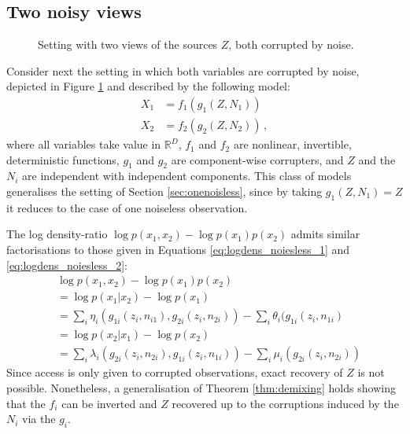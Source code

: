 \subsection{Two noisy views}
\label{sec:constrained}

\begin{figure}[t!]
	\centering
	\caption{Setting with two views of the sources $Z$, both corrupted by noise.}
	\label{fig:classic_hsr}
\end{figure}

Consider next the setting in which both variables are corrupted by noise, depicted in Figure \ref{fig:classic_hsr} and described by the following model:
\begin{align*}
X_{1}&={f}_{1}({g}_{1}({Z},N_{1}))  \\
X_{2}&={f}_{2}({g}_{2}({Z},N_{2}))  \,,
\end{align*}
where all variables take value in $\mathbb{R}^D$, ${f}_{1}$ and ${f}_{2}$ are nonlinear, invertible, deterministic functions,
${g}_{1}$ and ${g}_{2}$ are component-wise corrupters, and $Z$ and the $N_i$ are independent with independent components.
This class of models generalises the setting of Section \ref{sec:onenoisless}, since by taking ${g}_1(Z, N_1) = Z$ it reduces to the case of one noiseless observation.

The log density-ratio $\log p({x}_1, {x}_2) - \log p({x}_1)p({x}_2)$ admits similar factorisations to those given in Equations \ref{eq:logdens_noiesless_1} and \ref{eq:logdens_noiesless_2}:
\begin{align}
&\log p({x}_1, {x}_2) - \log p({x}_1) p({x}_2) \nonumber\\
&= \log p({x}_1 | {x}_2) - \log p({x}_1)\nonumber\\
&= \sum_i \eta_i(g_{1i}(z_i, n_{i1}), g_{2i}(z_i, n_{2i})) - \sum_i \theta_i(g_{1i}(z_i, n_{1i}) \label{eq:noisylogdens_1}\\
&= \log p({x}_2 | {x}_1) - \log p({x}_2) \nonumber\\
&= \sum_i \lambda_i(g_{2i}(z_i, n_{2i}), g_{1i}(z_i, n_{1i})) - \sum_i \mu_i(g_{2i}(z_i, n_{2i})) \label{eq:noisylogdens_2}
\end{align}
Since access is only given to corrupted observations, exact recovery of $Z$ is not possible.
Nonetheless, a generalisation of Theorem \ref{thm:demixing} holds showing that the ${f}_i$ can be inverted and $Z$ recovered up to the corruptions induced by the $N_i$ via the ${g}_i$.


